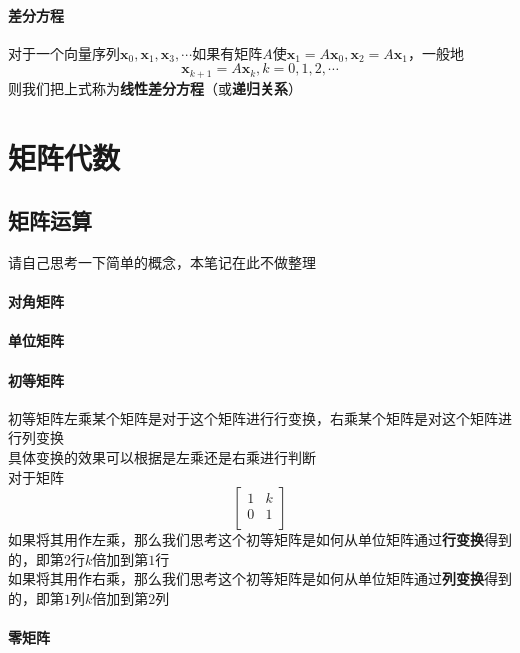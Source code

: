 \documentclass{article}
\newcommand{\ve}{\boldsymbol}
\begin{document}
\begin{CJK}{UTF8}{gkai}
\paragraph{差分方程\\}
对于一个向量序列$\ve{x}_0,\ve{x}_1,\ve{x}_3,\cdots$如果有矩阵$A$使$\ve{x}_1=A\ve{x}_0,\ve{x}_2=A\ve{x}_1$，一般地
\[\ve{x}_{k+1}=A\ve{x}_k,k=0,1,2,\cdots\]
则我们把上式称为\textbf{线性差分方程}（或\textbf{递归关系}）

\newpage
\section{矩阵代数}
\subsection{矩阵运算}
请自己思考一下简单的概念，本笔记在此不做整理\\
\paragraph{对角矩阵\\}
\paragraph{单位矩阵\\}
\paragraph{初等矩阵\\}
初等矩阵左乘某个矩阵是对于这个矩阵进行行变换，右乘某个矩阵是对这个矩阵进行列变换\\

具体变换的效果可以根据是左乘还是右乘进行判断\\
对于矩阵\[\begin{bmatrix}
    1&k\\
    0&1\\
\end{bmatrix}\]
如果将其用作左乘，那么我们思考这个初等矩阵是如何从单位矩阵通过\textbf{行变换}得到的，即第$2$行$k$倍加到第$1$行\\
如果将其用作右乘，那么我们思考这个初等矩阵是如何从单位矩阵通过\textbf{列变换}得到的，即第$1$列$k$倍加到第$2$列\\
\paragraph{零矩阵\\}

\end{CJK}
\end{document}
